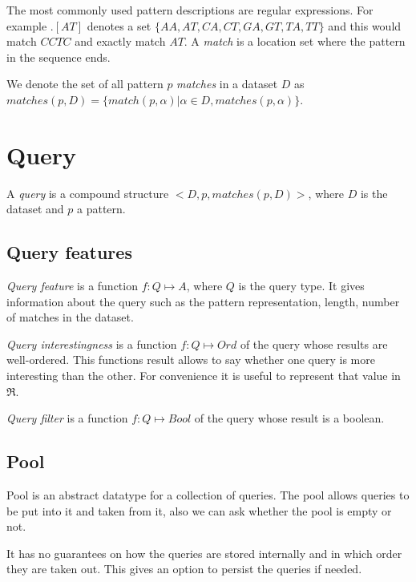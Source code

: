 The most commonly used pattern descriptions are regular expressions. For example $.[AT]$ denotes a set $\{AA, AT, CA, CT, GA, GT, TA, TT\}$ and this would match $CCTC$ and exactly match $AT$. A \emph{match} is a location set where the pattern in the sequence ends.

We denote the set of all pattern $p$ \emph{matches} in a dataset $D$ as $matches(p, D) = \{ match(p, \alpha) | \alpha \in D, matches(p, \alpha) \}$.

\section{Query}


A \emph{query} is a compound structure $<D, p, matches(p, D)>$, 
where $D$ is the dataset and $p$ a pattern. \eg

\subsection{Query features}


\emph{Query feature} is a function $f: Q \mapsto A$, 
where $Q$ is the query type. It gives information about 
the query such as the pattern representation, 
length, number of matches in the dataset.

\emph{Query interestingness} is a function $f: Q \mapsto Ord$ 
of the query whose results are well-ordered. This functions result allows to
say whether one query is more interesting than the other.
For convenience it is useful to represent that value in
$\Re$.

\emph{Query filter} is a function $f: Q \mapsto Bool$ of the query whose result
is a boolean.

\subsection{Pool}


Pool is an abstract datatype for a collection of queries. The pool allows queries to be put into it and taken from it, also we can ask whether the pool is empty or not.

It has no guarantees on how the queries are stored internally and in which order they are taken out. This gives an option to persist the queries if needed.

\eg

